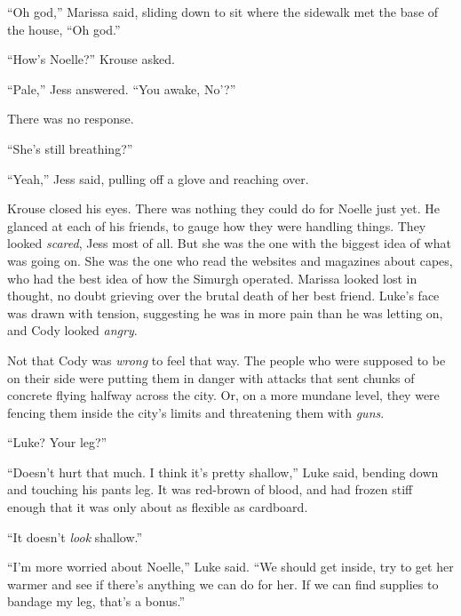 ``Oh god,'' Marissa said, sliding down to sit where the sidewalk met the base of the house, ``Oh god.''



``How's Noelle?'' Krouse asked.



``Pale,'' Jess answered.  ``You awake, No'?''



There was no response.



``She's still breathing?''



``Yeah,'' Jess said, pulling off a glove and reaching over.



Krouse closed his eyes.  There was nothing they could do for Noelle just yet.  He glanced at each of his friends, to gauge how they were handling things.  They looked \emph{scared}, Jess most of all.  But she was the one with the biggest idea of what was going on.  She was the one who read the websites and magazines about capes, who had the best idea of how the Simurgh operated.  Marissa looked lost in thought, no doubt grieving over the brutal death of her best friend.  Luke's face was drawn with tension, suggesting he was in more pain than he was letting on, and Cody looked \emph{angry}.



Not that Cody was \emph{wrong} to feel that way.  The people who were supposed to be on their side were putting them in danger with attacks that sent chunks of concrete flying halfway across the city.  Or, on a more mundane level, they were fencing them inside the city's limits and threatening them with \emph{guns}.



``Luke?  Your leg?''



``Doesn't hurt that much.  I think it's pretty shallow,'' Luke said, bending down and touching his pants leg.  It was red-brown of blood, and had frozen stiff enough that it was only about as flexible as cardboard.



``It doesn't \emph{look} shallow.''



``I'm more worried about Noelle,'' Luke said.  ``We should get inside, try to get her warmer and see if there's anything we can do for her.  If we can find supplies to bandage my leg, that's a bonus.''




